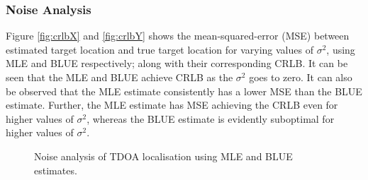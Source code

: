 \documentclass[11pt]{article}
\begin{document}

\subsubsection*{Noise Analysis}
\label{subsubsec:noiseAnalysis}

Figure \ref{fig:crlbX} and \ref{fig:crlbY} shows the mean-squared-error (MSE) between estimated target location and true target location for varying values of $\sigma^{2}$, using MLE and BLUE respectively; along with their corresponding CRLB. It can be seen that the MLE and BLUE achieve CRLB as the $
\sigma^{2}$ goes to zero. It can also be observed that the MLE estimate consistently has a lower MSE than the BLUE estimate. Further, the MLE estimate has MSE achieving the CRLB even for higher values of $\sigma^{2}$, whereas the BLUE estimate is evidently suboptimal for higher values of $\sigma^{2}$.
\begin{figure}[t]
\centering
{}
\caption{Noise analysis of TDOA localisation using MLE and BLUE estimates.}
\end{figure}
\end{document}
